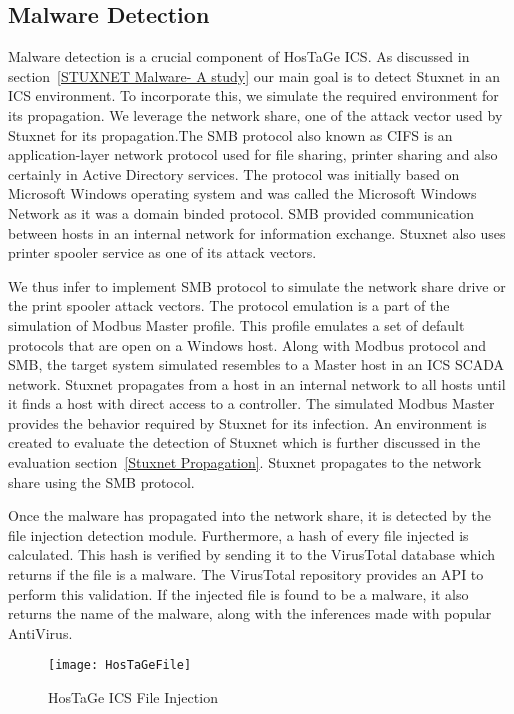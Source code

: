 \documentclass[article,msc=informatik,type=msc,colorback,accentcolor=tud9c]{tudthesis}
\begin{document}
	\subsection{Malware Detection}\label{Malware Detection}
	Malware detection is a crucial component of HosTaGe \ac{ICS}.  As discussed in section~\ref{STUXNET Malware- A study} our main goal is to detect Stuxnet in an \ac{ICS} environment. To incorporate this, we simulate the required environment for its propagation. We leverage the network share, one of the attack vector used by Stuxnet for its propagation\cite{chen2011lessons}.The \ac{SMB} protocol also known as \ac{CIFS} is an application-layer network protocol used for file sharing, printer sharing and also certainly in Active Directory services. The protocol was initially based on Microsoft Windows operating system and was called the Microsoft Windows Network as it was a domain binded protocol. \ac{SMB} provided communication between hosts in an internal network for information exchange.  Stuxnet also uses printer spooler service as one of its attack vectors.
	
	
	We thus infer to implement \ac{SMB} protocol to simulate the network share drive or the print spooler attack vectors. The protocol emulation is a part of the simulation of Modbus Master profile. This profile emulates a set of default protocols that are open on a Windows host. Along with Modbus protocol and \ac{SMB}, the target system simulated resembles to a Master host in an \ac{ICS} \ac{SCADA} network. Stuxnet propagates from a host in an internal network to all hosts until it finds a host with direct access to a controller. The simulated Modbus Master provides the behavior required by Stuxnet for its infection. An environment is created to evaluate the detection of Stuxnet which is further discussed in the evaluation section~\ref{Stuxnet Propagation}.  Stuxnet propagates to the network share using the \ac{SMB} protocol. 
	
	
	Once the malware has propagated into the network share, it is detected by the file injection detection module. Furthermore, a hash of every file injected is calculated. This hash is verified by sending it to the VirusTotal database which returns if the file is a malware. The VirusTotal repository provides an \ac{API} to perform this validation. If the injected file is found to be a malware, it also returns the name of the malware, along with the inferences made with popular AntiVirus. 
	
	\begin{figure}[H]
		\centering
		\texttt{[image: HosTaGeFile]}
		\caption[HosTaGe ICS File Injection]{\label{f:HosTaGe ICS File Injection}HosTaGe ICS File Injection}
	\end{figure}
	
\end{document}
